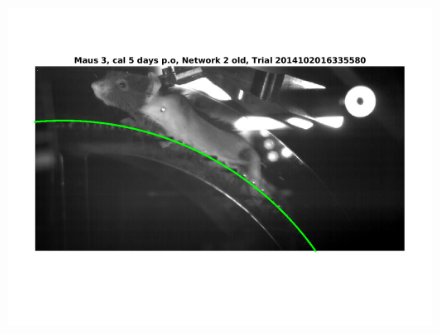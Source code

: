 \documentclass[
	fontsize=12pt,
	paper=a4,
	twoside=false,
	numbers=noenddot,
	plainheadsepline,
	toc=listof,
	toc=bibliography
]{scrartcl}
\begin{document}


\begin{figure} [htb] \centering
	\includegraphics[scale = 0.6]{images/mouse3/result_Maus_3_cal_5_days_Network_2_old.png}
\end{figure}


\end{document}

